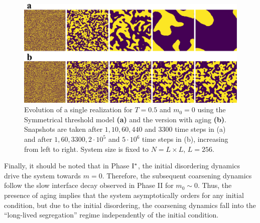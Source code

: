 \begin{figure}
        \centering \captionsetup{font=sf}
        \includegraphics[width=\linewidth]{Figs/Aging_STM/FIG13.pdf}
        \caption[System evolution at $T = 0.5$ and $m_0 = 0$]{\label{fig:snapshots} Evolution of a single realization for $T = 0.5$ and $m_0 = 0$ using the Symmetrical threshold model \textbf{(a)} and the version with aging \textbf{(b)}. Snapshots are taken after $1,10,60,440$ and $3300$ time steps in (a) and after $1,60,3300,2 \cdot 10^5$ and $5 \cdot 10^6$ time steps in (b), increasing from left to right. System size is fixed to $N = L \times L$, $L = 256$.}
\end{figure}

Finally, it should be noted that in Phase ${\rm I}^{*}$, the initial disordering dynamics drive the system towards $m=0$. Therefore, the subsequent coarsening dynamics follow the slow interface decay observed in Phase II for $m_0 \sim 0$. Thus, the presence of aging implies that the system asymptotically orders for any initial condition, but due to the initial disordering, the coarsening dynamics fall into the ``long-lived segregation'' regime independently of the initial condition. 

